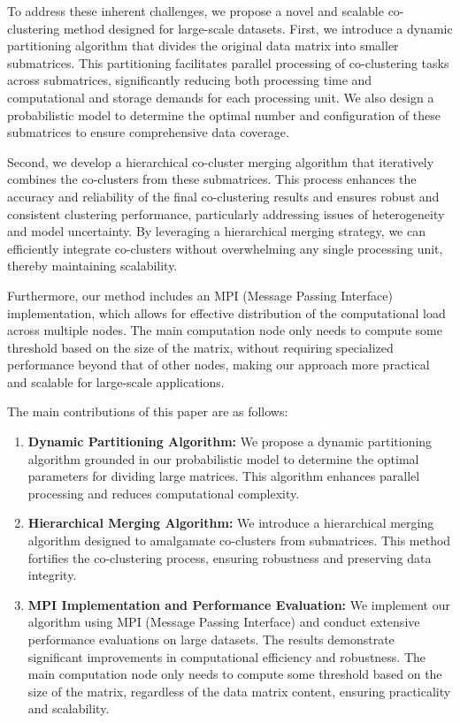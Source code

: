 \documentclass[journal]{IEEEtran}
\begin{document}
To address these inherent challenges, we propose a novel and scalable co-clustering method designed for large-scale datasets. First, we introduce a dynamic partitioning algorithm that divides the original data matrix into smaller submatrices. This partitioning facilitates parallel processing of co-clustering tasks across submatrices, significantly reducing both processing time and computational and storage demands for each processing unit. We also design a probabilistic model to determine the optimal number and configuration of these submatrices to ensure comprehensive data coverage.

Second, we develop a hierarchical co-cluster merging algorithm that iteratively combines the co-clusters from these submatrices. This process enhances the accuracy and reliability of the final co-clustering results and ensures robust and consistent clustering performance, particularly addressing issues of heterogeneity and model uncertainty. By leveraging a hierarchical merging strategy, we can efficiently integrate co-clusters without overwhelming any single processing unit, thereby maintaining scalability.

Furthermore, our method includes an MPI (Message Passing Interface) implementation, which allows for effective distribution of the computational load across multiple nodes. The main computation node only needs to compute some threshold based on the size of the matrix, without requiring specialized performance beyond that of other nodes, making our approach more practical and scalable for large-scale applications.

The main contributions of this paper are as follows:

\begin{enumerate}
  \item \textbf{Dynamic Partitioning Algorithm:} We propose a dynamic partitioning algorithm grounded in our probabilistic model to determine the optimal parameters for dividing large matrices. This algorithm enhances parallel processing and reduces computational complexity.
  \item \textbf{Hierarchical Merging Algorithm:} We introduce a hierarchical merging algorithm designed to amalgamate co-clusters from submatrices. This method fortifies the co-clustering process, ensuring robustness and preserving data integrity.
  \item \textbf{MPI Implementation and Performance Evaluation:} We implement our algorithm using MPI (Message Passing Interface) and conduct extensive performance evaluations on large datasets. The results demonstrate significant improvements in computational efficiency and robustness. The main computation node only needs to compute some threshold based on the size of the matrix, regardless of the data matrix content, ensuring practicality and scalability.
\end{enumerate}
\end{document}
